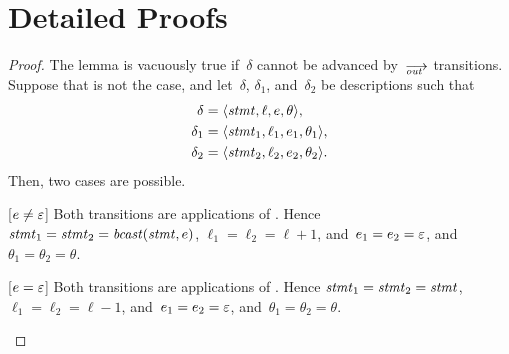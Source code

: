 \section{Detailed Proofs}
\label{sec.appendix}


\lemxdetout*
\begin{proof}
  The lemma is vacuously true if~$\delta$ cannot be advanced by~$\out$
  transitions.  Suppose that is not the case, and let~$\delta$, $\delta_1$,
  and~$\delta_2$ be descriptions such that
  \begin{align*}
    \delta  &=\<\stmt,\ell,e,\theta>,\\
    \delta_1&=\<\stmt_1,\ell_1,e_1,\theta_1>,\\
    \delta_2&=\<\stmt_2,\ell_2,e_2,\theta_2>.
  \end{align*}
  Then, two cases are possible.
  \begin{case}
  \item[{[$e\ne\varepsilon$]}] Both transitions are applications of .
    Hence $\mathit{stmt}_1=\mathit{stmt}_2=\mathop{\mathit{bcast}}(\mathit{stmt},e)$, $\ell_1=\ell_2=\ell+1$,
    and~$e_1=e_2=\varepsilon$, and~$\theta_1=\theta_2=\theta$.
  \item[{[$e=\varepsilon$]}] Both transitions are applications of .  Hence
    $\mathit{stmt}_1=\mathit{stmt}_2=\mathit{stmt}$, $\ell_1=\ell_2=\ell-1$, and~$e_1=e_2=\varepsilon$,
    and~$\theta_1=\theta_2=\theta$.\qedhere
  \end{case}
\end{proof}


